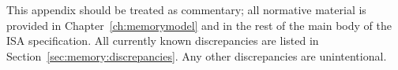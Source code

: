 This appendix should be treated as commentary; all normative material is provided in Chapter~\ref{ch:memorymodel} and in the rest of the main body of the ISA specification.
All currently known discrepancies are listed in Section~\ref{sec:memory:discrepancies}.
Any other discrepancies are unintentional.

\clearpage


\clearpage


\clearpage

